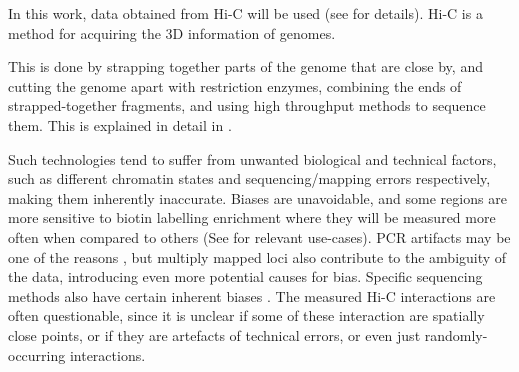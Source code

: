 In this work, data obtained from Hi-C will be used (see  for
details). Hi-C is a method for acquiring the 3D information of genomes.
% 

This is done by strapping together parts of the genome that are close by,
and cutting the genome apart with restriction enzymes, combining the ends of
strapped-together fragments, and using high throughput methods to sequence
them. This is explained in detail in .



Such technologies tend to suffer from unwanted biological and technical factors, such as different chromatin
states \cite{pmid19693276} and sequencing/mapping errors \cite{pmid21646344} respectively,
making them inherently inaccurate. Biases are unavoidable, and
some regions are more sensitive to biotin labelling
enrichment where they will be
measured more often when compared to others (See  for relevant use-cases).
PCR artifacts may be one of the
reasons \cite{wingett2015hicup}, but multiply mapped loci also contribute to the ambiguity of the data,
introducing even more potential causes for bias. Specific sequencing methods also
have certain inherent biases \cite{aird2011analyzing}. The measured Hi-C interactions are
often questionable, since it is unclear if some of these interaction are spatially close points, or if
they are artefacts of technical errors, or even just randomly-occurring interactions.



